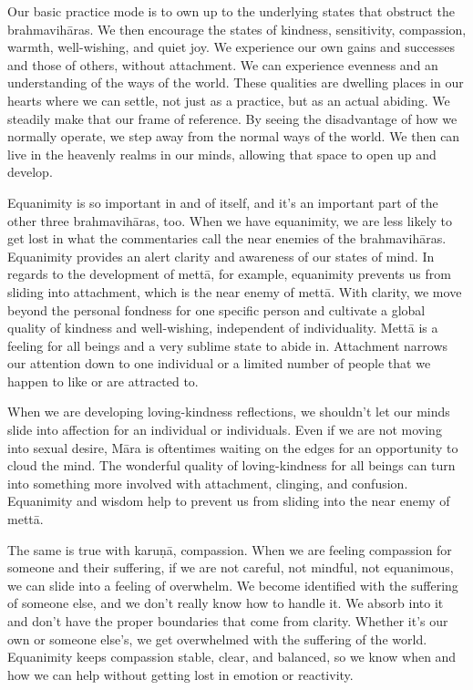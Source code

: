 Our basic practice mode is to own up to the underlying states that obstruct the brahmavihāras. We then encourage the states of kindness, sensitivity, compassion, warmth, well-wishing, and quiet joy. We experience our own gains and successes and those of others, without attachment. We can experience evenness and an understanding of the ways of the world. These qualities are dwelling places in our hearts where we can settle, not just as a practice, but as an actual abiding. We steadily make that our frame of reference. By seeing the disadvantage of how we normally operate, we step away from the normal ways of the world. We then can live in the heavenly realms in our minds, allowing that space to open up and develop.

Equanimity is so important in and of itself, and it's an important part of the other three brahmavihāras, too. When we have equanimity, we are less likely to get lost in what the commentaries call the near enemies of the brahmavihāras. Equanimity provides an alert clarity and awareness of our states of mind. In regards to the development of mettā, for example, equanimity prevents us from sliding into attachment, which is the near enemy of mettā. With clarity, we move beyond the personal fondness for one specific person and cultivate a global quality of kindness and well-wishing, independent of individuality. Mettā is a feeling for all beings and a very sublime state to abide in. Attachment narrows our attention down to one individual or a limited number of people that we happen to like or are attracted to.

When we are developing loving-kindness reflections, we shouldn't let our minds slide into affection for an individual or individuals. Even if we are not moving into sexual desire, Māra is oftentimes waiting on the edges for an opportunity to cloud the mind. The wonderful quality of loving-kindness for all beings can turn into something more involved with attachment, clinging, and confusion. Equanimity and wisdom help to prevent us from sliding into the near enemy of mettā.

The same is true with karuṇā, compassion. When we are feeling compassion for someone and their suffering, if we are not careful, not mindful, not equanimous, we can slide into a feeling of overwhelm. We become identified with the suffering of someone else, and we don't really know how to handle it. We absorb into it and don't have the proper boundaries that come from clarity. Whether it's our own or someone else's, we get overwhelmed with the suffering of the world. Equanimity keeps compassion stable, clear, and balanced, so we know when and how we can help without getting lost in emotion or reactivity.

